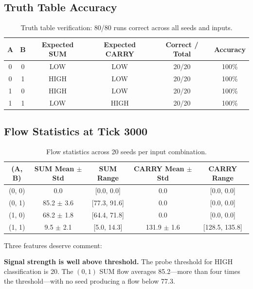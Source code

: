 \documentclass[11pt,a4paper]{article}
\begin{document}
\subsection{Truth Table Accuracy}

\begin{table}[H]
\centering
\begin{tabular}{cccccc}
\toprule
\textbf{A} & \textbf{B} & \textbf{Expected SUM} & \textbf{Expected CARRY} & \textbf{Correct / Total} & \textbf{Accuracy} \\
\midrule
0 & 0 & LOW  & LOW  & 20/20 & 100\% \\
0 & 1 & HIGH & LOW  & 20/20 & 100\% \\
1 & 0 & HIGH & LOW  & 20/20 & 100\% \\
1 & 1 & LOW  & HIGH & 20/20 & 100\% \\
\bottomrule
\end{tabular}
\caption{Truth table verification: 80/80 runs correct across all seeds and inputs.}
\label{tab:truth}
\end{table}

\subsection{Flow Statistics at Tick 3000}

\begin{table}[H]
\centering
\begin{tabular}{ccccc}
\toprule
\textbf{(A, B)} & \textbf{SUM Mean $\pm$ Std} & \textbf{SUM Range} & \textbf{CARRY Mean $\pm$ Std} & \textbf{CARRY Range} \\
\midrule
(0, 0) & 0.0 & [0.0, 0.0] & 0.0 & [0.0, 0.0] \\
(0, 1) & 85.2 $\pm$ 3.6 & [77.3, 91.6] & 0.0 & [0.0, 0.0] \\
(1, 0) & 68.2 $\pm$ 1.8 & [64.4, 71.8] & 0.0 & [0.0, 0.0] \\
(1, 1) & 9.5 $\pm$ 2.1 & [5.0, 14.3] & 131.9 $\pm$ 1.6 & [128.5, 135.8] \\
\bottomrule
\end{tabular}
\caption{Flow statistics across 20 seeds per input combination.}
\label{tab:flow}
\end{table}

Three features deserve comment:

\textbf{Signal strength is well above threshold.} The probe threshold for HIGH classification is 20. The $(0,1)$ SUM flow averages 85.2---more than four times the threshold---with no seed producing a flow below 77.3.
\end{document}
